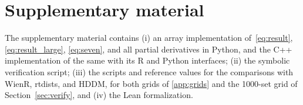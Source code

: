 \documentclass[final,5p,times,twocolumn,authoryear]{elsarticle}
\begin{document}
\section{Supplementary material}

The supplementary material contains (i) an array implementation of~\eqref{eq:result}, \eqref{eq:result_large}, \eqref{eq:seven}, and all partial derivatives in Python, and the C++ implementation of the same with its R and Python interfaces; (ii) the symbolic verification script; (iii) the scripts and reference values for the comparisons with WienR, rtdists, and HDDM, for both grids of \ref{app:grids} and the 1000-set grid of Section~\ref{sec:verify}, and (iv) the Lean formalization.



\end{document}
